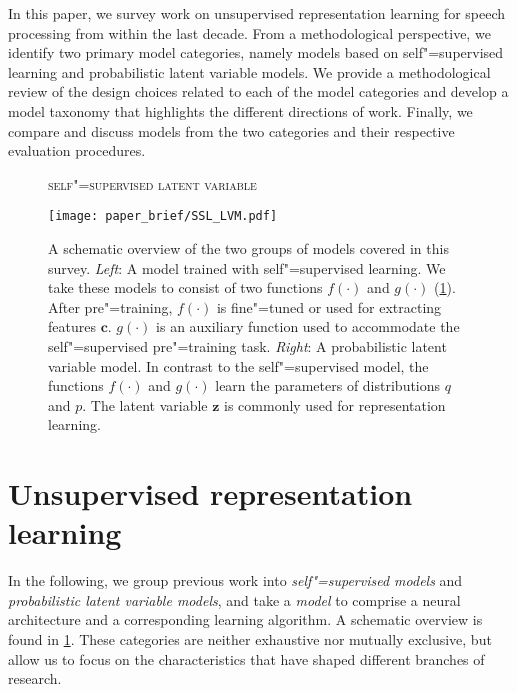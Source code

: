 {In this paper, we survey work on unsupervised representation learning for speech processing from within the last decade.
From a methodological perspective, we identify two primary model categories, namely models based on self"=supervised learning and probabilistic latent variable models. 
We provide a methodological review of the design choices related to each of the model categories and develop a model taxonomy that highlights the different directions of work. Finally, we compare and discuss models from the two categories and their respective evaluation procedures.

\begin{figure}
    \begin{flushleft}
        \textsc{\small \hspace{0.16\textwidth} self"=supervised \hspace{0.22\textwidth} latent variable}
    \end{flushleft}
    \centering
    \texttt{[image: paper\_brief/SSL\_LVM.pdf]}
    \caption[Schematic overview of the self"=supervised and probabilistic latent variable models covered in this survey.]{ A schematic overview of the two groups of models covered in this survey. \textit{Left}: A model trained with self"=supervised learning. We take these models to consist of two functions $f(\cdot)$ and $g(\cdot)$ (\cref{ssec:notation}). After pre"=training, $f(\cdot)$ is fine"=tuned or used for extracting features $\mathbf{c}$. $g(\cdot)$ is an auxiliary function used to accommodate the self"=supervised pre"=training task. \textit{Right}: A probabilistic latent variable model. In contrast to the self"=supervised model, the functions $f(\cdot)$ and $g(\cdot)$ learn the parameters of distributions $q$ and $p$. The latent variable $\mathbf{z}$ is commonly used for representation learning.}
    \label{fig:ssl_lvm}
\end{figure}

\section{Unsupervised representation learning}\label{ssec:notation}

In the following, we group previous work into \textit{self"=supervised models} and \textit{probabilistic latent variable models}, and take a \emph{model} to comprise a neural architecture and a corresponding learning algorithm. A schematic overview is found in \cref{fig:ssl_lvm}. These categories are neither exhaustive nor mutually exclusive, but allow us to focus on the characteristics that have shaped different branches of research. 

}
